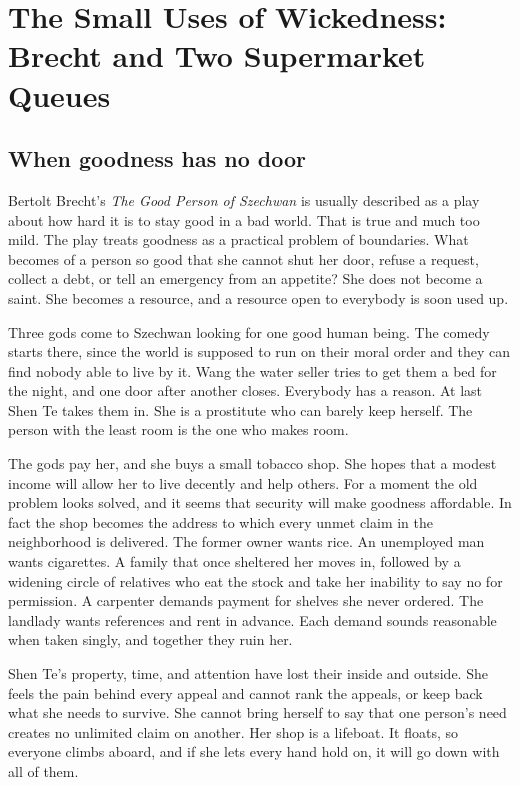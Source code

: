 \documentclass[12pt,a4paper]{book}
\begin{document}
\chapter[The Small Uses of Wickedness]{The Small Uses of Wickedness: Brecht and Two Supermarket Queues}
\label{chap:small-wickedness}

\section{When goodness has no door}

Bertolt Brecht's \emph{The Good Person of Szechwan} is usually described as a play about how hard it is to stay good in a bad world. That is true and much too mild. The play treats goodness as a practical problem of boundaries. What becomes of a person so good that she cannot shut her door, refuse a request, collect a debt, or tell an emergency from an appetite? She does not become a saint. She becomes a resource, and a resource open to everybody is soon used up.

Three gods come to Szechwan looking for one good human being. The comedy starts there, since the world is supposed to run on their moral order and they can find nobody able to live by it. Wang the water seller tries to get them a bed for the night, and one door after another closes. Everybody has a reason. At last Shen Te takes them in. She is a prostitute who can barely keep herself. The person with the least room is the one who makes room.

The gods pay her, and she buys a small tobacco shop. She hopes that a modest income will allow her to live decently and help others. For a moment the old problem looks solved, and it seems that security will make goodness affordable. In fact the shop becomes the address to which every unmet claim in the neighborhood is delivered. The former owner wants rice. An unemployed man wants cigarettes. A family that once sheltered her moves in, followed by a widening circle of relatives who eat the stock and take her inability to say no for permission. A carpenter demands payment for shelves she never ordered. The landlady wants references and rent in advance. Each demand sounds reasonable when taken singly, and together they ruin her.

Shen Te's property, time, and attention have lost their inside and outside. She feels the pain behind every appeal and cannot rank the appeals, or keep back what she needs to survive. She cannot bring herself to say that one person's need creates no unlimited claim on another. Her shop is a lifeboat. It floats, so everyone climbs aboard, and if she lets every hand hold on, it will go down with all of them.
\end{document}
